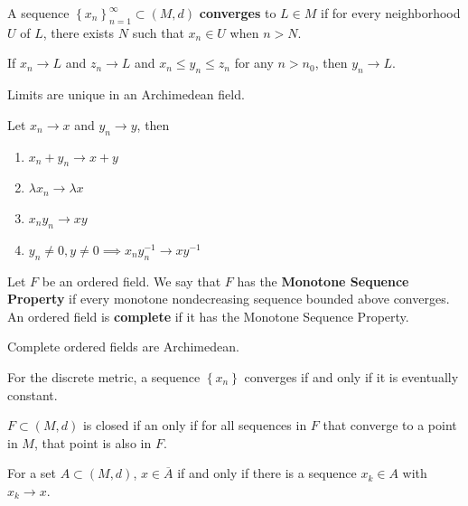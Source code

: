 \documentclass[twoside,10pt]{report}
\begin{document}
\begin{defn}[]
	A sequence $\left\{ x_n \right\}_{n=1}^\infty \subset (M,d)$ \textbf{converges} to $L \in M$ if for every neighborhood $U$ of $L$, there exists $N$ such that $x_n \in U$ when $n > N$.
\end{defn}


\begin{prop}
	If $x_n \to L$ and $z_n \to L$ and $x_n \leq y_n \leq z_n$ for any $n > n_0$, then $y_n \to L$.
\end{prop}

\begin{prop}
	Limits are unique in an Archimedean field.
\end{prop}

\begin{thrm}
Let $x_n \to x$ and $y_n \to y$, then
\begin{enumerate}
	\item $x_n + y_n \to x+y$
	\item $\lambda x_n \to \lambda x$
	\item $x_n y_n \to xy$ 
	\item $y_n \neq 0, y \neq 0 \implies x_n y_n^{-1} \to xy^{-1}$
\end{enumerate}
\end{thrm}

\begin{defn}
	Let $F$ be an ordered field. We say that $F$ has the \textbf{Monotone Sequence Property} if every monotone nondecreasing sequence bounded above converges. An ordered field is \textbf{complete} if it has the Monotone Sequence Property.
\end{defn}

Complete ordered fields are Archimedean.

\begin{ex}[]
	For the discrete metric, a sequence $\left\{ x_n \right\}$ converges if and only if it is eventually constant.
\end{ex}

\begin{prop}
	$F\subset (M,d)$ is closed if an only if for all sequences in $F$ that converge to a point in $M$, that point is also in $F$.
\end{prop}

\begin{prop}
	For a set $A \subset (M,d)$, $x \in \overline{A}$ if and only if there is a sequence $x_k \in A$ with $x_k \to x$.
\end{prop}
\end{document}
